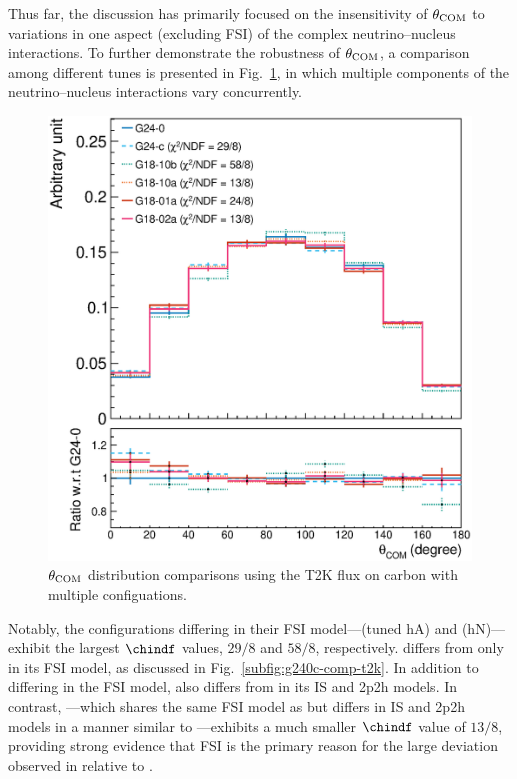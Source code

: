      Thus far, the discussion has primarily focused on the insensitivity of $\theta_{\textrm{COM}}$ to variations in one aspect (excluding FSI) of the complex neutrino–nucleus interactions.
     To further demonstrate the robustness of $\theta_{\textrm{COM}}$, a comparison among different \genie tunes is presented in Fig.~\ref{fig:mod-comp}, in which multiple components of the neutrino–nucleus interactions vary concurrently.
     \begin{figure}[ht!]
          \centering
          \includegraphics[width=\scfigwid\textwidth]{figures/COM/anorm-mod-ratio_da_tan.eps}
     \caption{$\theta_{\textrm{COM}}$ distribution comparisons using the T2K flux on carbon with multiple \genie configuations. }
     \label{fig:mod-comp}
     \end{figure}

     Notably, the configurations differing in their FSI model—\gC (tuned hA) and \getb (hN)—exhibit the largest $\chindf$ values, $29/8$ and $58/8$, respectively.
     \gC differs from \gZero only in its FSI model, as discussed in Fig.~\ref{subfig:g240c-comp-t2k}.
     In addition to differing in the FSI model, \getb also differs from \gZero in its IS and 2p2h models.
     In contrast, \geta—which shares the same FSI model as \gZero but differs in IS and 2p2h models in a manner similar to \getb—exhibits a much smaller $\chindf$ value of $13/8$, providing strong evidence that FSI is the primary reason for the large deviation observed in \getb relative to \gZero.

